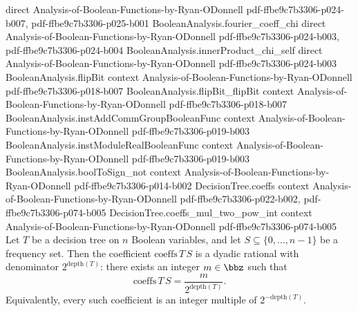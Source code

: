 \begin{lemma}
  {direct}
  {Analysis-of-Boolean-Functions-by-Ryan-ODonnell}
  {pdf-ffbe9c7b3306-p024-b007,
    pdf-ffbe9c7b3306-p025-b001}
\proofstep
  {BooleanAnalysis.fourier_coeff_chi}
  {direct}
  {Analysis-of-Boolean-Functions-by-Ryan-ODonnell}
  {pdf-ffbe9c7b3306-p024-b003,
    pdf-ffbe9c7b3306-p024-b004}
\proofstep
  {BooleanAnalysis.innerProduct_chi_self}
  {direct}
  {Analysis-of-Boolean-Functions-by-Ryan-ODonnell}
  {pdf-ffbe9c7b3306-p024-b003}
\proofstep
  {BooleanAnalysis.flipBit}
  {context}
  {Analysis-of-Boolean-Functions-by-Ryan-ODonnell}
  {pdf-ffbe9c7b3306-p018-b007}
\proofstep
  {BooleanAnalysis.flipBit_flipBit}
  {context}
  {Analysis-of-Boolean-Functions-by-Ryan-ODonnell}
  {pdf-ffbe9c7b3306-p018-b007}
\proofstep
  {BooleanAnalysis.instAddCommGroupBooleanFunc}
  {context}
  {Analysis-of-Boolean-Functions-by-Ryan-ODonnell}
  {pdf-ffbe9c7b3306-p019-b003}
\proofstep
  {BooleanAnalysis.instModuleRealBooleanFunc}
  {context}
  {Analysis-of-Boolean-Functions-by-Ryan-ODonnell}
  {pdf-ffbe9c7b3306-p019-b003}
\proofstep
  {BooleanAnalysis.boolToSign_not}
  {context}
  {Analysis-of-Boolean-Functions-by-Ryan-ODonnell}
  {pdf-ffbe9c7b3306-p014-b002}
\proofstep
  {DecisionTree.coeffs}
  {context}
  {Analysis-of-Boolean-Functions-by-Ryan-ODonnell}
  {pdf-ffbe9c7b3306-p022-b002,
    pdf-ffbe9c7b3306-p074-b005}
\proofstep
  {DecisionTree.coeffs_mul_two_pow_int}
  {context}
  {Analysis-of-Boolean-Functions-by-Ryan-ODonnell}
  {pdf-ffbe9c7b3306-p074-b005}
Let $T$ be a decision tree on $n$ Boolean variables, and let $S \subseteq
\{0,\dots,n-1\}$ be a frequency set. Then the coefficient $\mathrm{coeffs}\,T\,S$ is a
dyadic rational with denominator $2^{\mathrm{depth}(T)}$: there exists an integer $m \in
\bbz$ such that \[ \mathrm{coeffs}\,T\,S = \frac{m}{2^{\mathrm{depth}(T)}}. \]
Equivalently, every such coefficient is an integer multiple of $2^{-\mathrm{depth}(T)}$.
\end{lemma}


